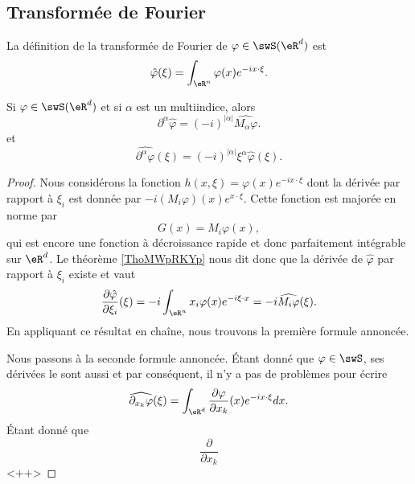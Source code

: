 \subsection{Transformée de Fourier}

La définition de la transformée de Fourier de \( \varphi\in\swS(\eR^d)\) est 
\begin{equation}
    \hat  \varphi(\xi)=\int_{\eR^n}\varphi(x) e^{-ix\cdot \xi}.
\end{equation}

\begin{lemma}
    Si \( \varphi\in\swS(\eR^d)\) et si \( \alpha\) est un multiindice, alors
    \begin{equation}
        \partial^{\alpha}\hat\varphi=(-i)^{| \alpha |}\widehat{M_{\alpha}\varphi}.
    \end{equation}
    et
    \begin{equation}
        \widehat{\partial^{\alpha}\varphi}(\xi)=(-i)^{| \alpha |}\xi^{\alpha}\hat\varphi(\xi).
    \end{equation}
\end{lemma}

\begin{proof}
    Nous considérons la fonction \( h(x,\xi)=\varphi(x) e^{-ix\cdot \xi}\) dont la dérivée par rapport à \( \xi_i\) est donnée par \( -i(M_{i}\varphi)(x) e^{x\cdot \xi}\). Cette fonction est majorée en norme par
    \begin{equation}
        G(x)=M_i\varphi(x),
    \end{equation}
    qui est encore une fonction à décroissance rapide et donc parfaitement intégrable sur \( \eR^d\). Le théorème \ref{ThoMWpRKYp} nous dit donc que la dérivée de \( \hat \varphi\) par rapport à \( \xi_i\) existe et vaut
    \begin{equation}
        \frac{ \partial \hat\varphi }{ \partial \xi_i }(\xi)=-i\int_{\eR^n}x_i\varphi(x) e^{-i\xi\cdot x}=-i\widehat{M_i\varphi}(\xi).
    \end{equation}
    En appliquant ce résultat en chaîne, nous trouvons la première formule annoncée.

    Nous passons à la seconde formule annoncée. Étant donné que \( \varphi\in\swS\), ses dérivées le sont aussi et par conséquent, il n'y a pas de problèmes pour écrire
    \begin{equation}
        \widehat{\partial_{x_k}\varphi}(\xi)=\int_{\eR^d}\frac{ \partial \varphi }{ \partial x_k }(x) e^{-ix\cdot \xi}dx.
    \end{equation}
    Étant donné que
    \begin{equation}
        \frac{ \partial  }{ \partial x_k }
    \end{equation}
    <++>
\end{proof}


